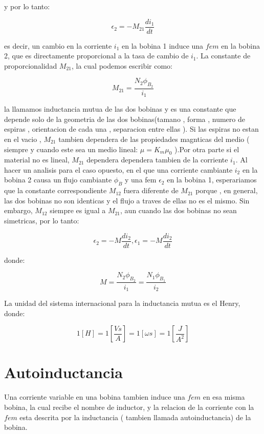 \documentclass[13pt,twoside]{article}
\begin{document}
 y por lo tanto:
 
 \begin{equation}
 \epsilon_{2}=-M_{21}\frac{di_{1}}{dt}
 \end{equation}
 
 es decir, un cambio en la corriente $i_{1}$ en la bobina 1 induce una $fem$ en la bobina 2, que es directamente proporcional a la tasa de cambio de $i_{1}$.
 La constante de proporcionalidad $M_{21}$, la cual podemos escribir como:
 
 \begin{equation}
 \displaystyle M_{21}=\frac{N_{2}\phi_{B_{2}}}{i_{1}}
 \end{equation}
 
 la llamamos inductancia mutua de las dos bobinas y es una constante que depende solo de la geometria de las dos bobinas(tamano , forma , numero de espiras , orientacion de cada una , separacion entre ellas ). Si las espiras no estan en el vacio , $M_{21}$ tambien dependera de las propiedades magnticas del medio ( siempre y cuando este sea un medio lineal: $\mu=K_{m}\mu_{0}$ ).Por otra parte si el material no es lineal, $M_{21}$ dependera dependera tambien de la corriente $i_{1}$. Al hacer un analisis para el caso opuesto, en el que una corriente cambiante $i_{2}$ en la bobina 2 causa un flujo cambiante $\phi_{B}$ y una fem $\epsilon_{2}$ en la bobina 1, esperariamos que la constante correspondiente $M_{12}$ fuera diferente de  $M_{21}$  porque , en general, las dos bobinas no son identicas y el flujo a traves de ellas no es el mismo. Sin embargo, $M_{12}$ siempre es igual a $M_{21}$, aun cuando las dos bobinas no sean simetricas, por lo tanto:
 
 \begin{equation}
 \displaystyle\epsilon_{2}=-M\frac{di_{2}}{dt},\epsilon_{1}=-M\frac{di_{2}}{dt}
\end {equation}

donde:

\begin{equation}
M=\frac{N_{2}\phi_{B_{2}}}{i_{1}}=\frac{ N_{1}\phi_{B_{1}}}{i_{2}}
\end {equation}

La unidad del sistema internacional para la inductancia mutua es el Henry, donde:

\begin{equation}
1[H]=1[\frac{Vs}{A}]=1[\omega s ]=1[\frac{J}{A^2}]
\end{equation}

\section{Autoinductancia}
Una corriente variable en una bobina tambien induce una $fem$ en esa misma bobina, la cual recibe el nombre de inductor, y la relacion de la corriente con la $fem$ esta descrita por la inductancia ( tambien llamada autoinductancia) de la bobina.\\
\end{document}
